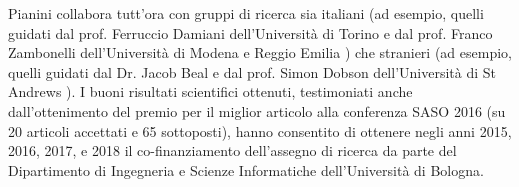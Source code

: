 \documentclass[10pt]{article}
\begin{document}
Pianini collabora tutt'ora con gruppi di ricerca sia italiani (ad esempio, quelli guidati dal prof. Ferruccio Damiani dell'Università di Torino \cite{TOMACS2018} e dal prof. Franco Zambonelli dell'Università di Modena e Reggio Emilia \cite{ViroliSCP2015}) che stranieri (ad esempio, quelli guidati dal Dr. Jacob Beal \cite{BealIEEEComputer2015} e dal prof. Simon Dobson dell'Università di St Andrews \cite{SASO2017-counting}). I buoni risultati scientifici ottenuti, testimoniati anche dall'ottenimento del premio per il miglior articolo alla conferenza SASO 2016 \cite{BealSASO2016} (su 20 articoli accettati e 65 sottoposti), hanno consentito di ottenere negli anni 2015, 2016, 2017, e 2018 il co-finanziamento dell'assegno di ricerca da parte del Dipartimento di Ingegneria e Scienze Informatiche dell'Università di Bologna.
\end{document}
